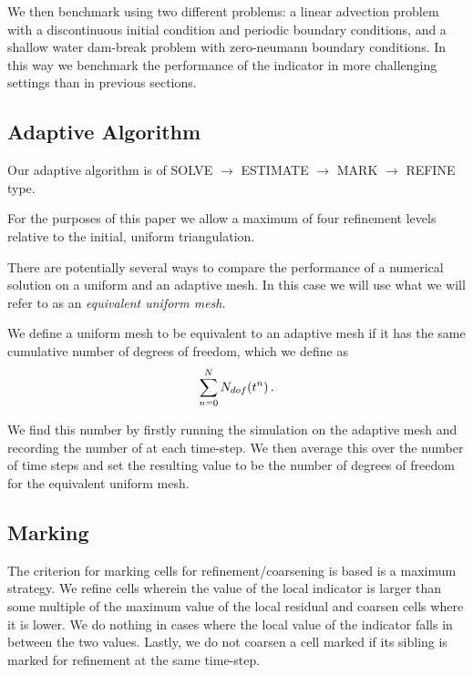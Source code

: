\documentclass[final]{amsart}
\numberwithin{equation}{section}
\begin{document}
We then  benchmark using  two different problems: a linear advection problem with a discontinuous initial condition and periodic boundary conditions, and a shallow water dam-break problem with zero-neumann boundary conditions.  In this way we benchmark the performance of the indicator in more challenging settings than in previous sections. 

\subsection{Adaptive Algorithm}
Our adaptive algorithm is of SOLVE $\to$ ESTIMATE $\to$ MARK $\to$ REFINE type.

\begin{Rem}
For the purposes of this paper we allow a maximum of  four  refinement levels relative to the initial, uniform triangulation. 
\end{Rem}
There are potentially several ways to compare the performance of a numerical solution on a uniform and an adaptive mesh.  In this case we will use what we will refer to as an \textit{equivalent uniform mesh}.
\begin{Defn}  \label{defn:equiv_uniform_mesh} We define a uniform mesh to be equivalent to an adaptive mesh if it has the same cumulative number of degrees of freedom, which we define as
	\begin{equation}
\sum_{n=0}^{N}N_{dof}\!\left({t^n}\right).
	\end{equation}
\end{Defn}
 We find this number by firstly running the simulation on the adaptive mesh and recording the number of  at each time-step.  We then average this over the number of time steps and set the resulting value to be the number of degrees of freedom for the equivalent uniform mesh.

\subsection{Marking}
The criterion for marking cells for refinement/coarsening is based is a maximum strategy.  We refine cells wherein  the value of the local indicator is larger than some multiple of the maximum value of the local residual and coarsen cells where it is lower.  We  do nothing in cases where the local value of the indicator falls in between the two values.  Lastly, we do not coarsen a cell marked if its sibling is marked for   refinement at the same time-step.
\end{document}

